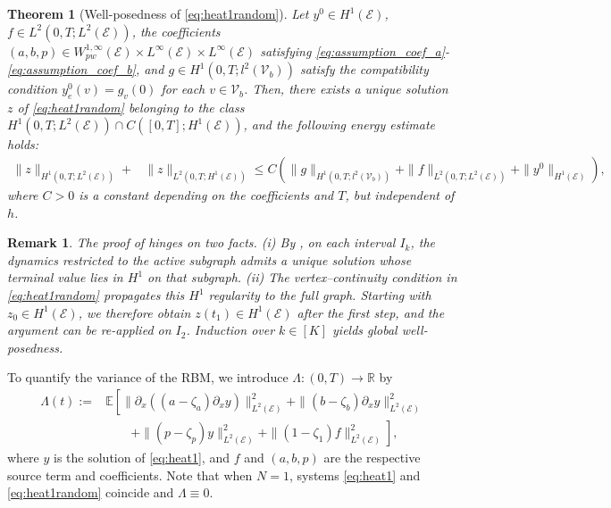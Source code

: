 \documentclass[10pt,a4paper]{amsart}
\def\R{\mathbb R}
\def\to{\rightarrow}
\newtheorem{theorem}{Theorem}[section]
\newtheorem{remark}{Remark}[section]
\begin{document}
\begin{theorem}[{Well-posedness of \eqref{eq:heat1random}}]\label{th:wellpossednes_random}
    Let $y^0 \in H^1(\mathcal{E})$, $f \in L^2(0, T; L^2(\mathcal{E}))$, the coefficients $(a, b, p) \in W^{1,\infty}_{pw}(\mathcal{E}) \times L^\infty(\mathcal{E}) \times L^\infty(\mathcal{E})$ satisfying \eqref{eq:assumption_coef_a}-\eqref{eq:assumption_coef_b}, and $g \in H^1(0, T; l^2(\mathcal{V}_b))$ satisfy the compatibility condition $y^0_e(v) = g_v(0)$ for each $v \in \mathcal{V}_b$. Then, there exists a unique solution $z$ of \eqref{eq:heat1random} belonging to the class $H^{1}(0, T; L^2(\mathcal{E})) \cap C([0, T]; H^1(\mathcal{E}))$, and the following energy estimate holds:
    \begin{align}\label{eq:energy_heat}
     \|z\|_{H^1(0, T; L^2(\mathcal{E}))} + &\|z\|_{L^2(0, T; H^1(\mathcal{E}))} \leq C \left( \|g\|_{H^1(0, T; l^2(\mathcal{V}_b))} + \|f\|_{L^2(0, T; L^2(\mathcal{E}))}+ \|y^0\|_{H^1(\mathcal{E})} \right),
    \end{align}
    where $C > 0$  is a constant depending on the coefficients and $T$, but independent of $h$. 
\end{theorem}

\begin{remark}
The proof of  hinges on two facts. (i) By , on each interval $I_k$, the dynamics restricted to the active subgraph admits a unique solution whose terminal value lies in $H^{1}$ on that subgraph. (ii)  The vertex–continuity condition in \eqref{eq:heat1random} propagates this $H^{1}$ regularity to the full graph.  
Starting with $z_0\in H^{1}(\mathcal{E})$, we therefore obtain $z(t_1)\in H^{1}(\mathcal{E})$ after the first step, and the argument can be re-applied on $I_{2}$. Induction over $k\in[K]$ yields global well-posedness.
\end{remark}

\smallbreak

To quantify the variance of the RBM, we introduce $\Lambda:(0,T)\to\R$ by
\begin{align}\label{eq:def_lambda}
     \Lambda(t) :=&
    \mathbb{E}\left[\|\partial_{x}((a - \zeta_a) \partial_x y)\|_{L^2(\mathcal{E})}^2 + \| (b - \zeta_b) \partial_x y\|_{L^2(\mathcal{E})}^2\right.\\
    &\nonumber\qquad\left.+ \|(p - \zeta_p) y\|_{L^2(\mathcal{E})}^2 + \|(1-\zeta_1 ) f\|_{L^2(\mathcal{E})}^2\right],
\end{align}
where $y$ is the solution of \eqref{eq:heat1}, and $f$ and $(a,b,p)$ are the respective source term and coefficients. Note that when $N = 1$,  systems \eqref{eq:heat1} and \eqref{eq:heat1random} coincide and $\Lambda \equiv 0$.
\end{document}
